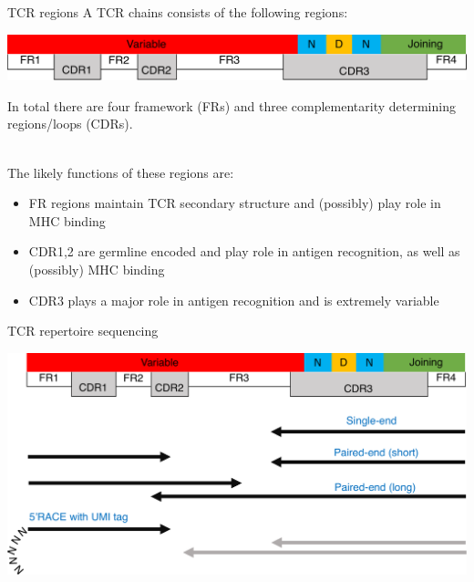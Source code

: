 \documentclass[12pt]{beamer}
\begin{document}
\begin{frame}{TCR regions}
A TCR chains consists of the following regions:
\begin{center}
\includegraphics[width=\textwidth]{p4}
\end{center}
In total there are four framework (FRs) and three complementarity determining regions/loops (CDRs). \\~\

\pause
The likely functions of these regions are:
\begin{itemize}
\item FR regions maintain TCR secondary structure and (possibly) play role in MHC binding
\item CDR1,2 are germline encoded and play role in antigen recognition, as well as (possibly) MHC binding
\item CDR3 plays a major role in antigen recognition and is extremely variable
\end{itemize}
\end{frame}

\begin{frame}{TCR repertoire sequencing}
\begin{center}
\includegraphics[width=\textwidth]{p5}
\end{center}
\end{frame}
\end{document}
